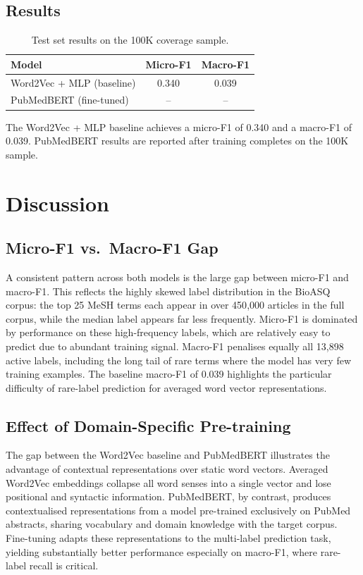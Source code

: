 \documentclass[sigconf]{acmart}
\begin{document}
\subsection{Results}

\begin{table}[h]
\caption{Test set results on the 100K coverage sample.}
\label{tab:results}
\begin{tabular}{lcc}
\toprule
\textbf{Model} & \textbf{Micro-F1} & \textbf{Macro-F1} \\
\midrule
Word2Vec + MLP (baseline) & 0.340 & 0.039 \\
PubMedBERT (fine-tuned)   & --    & --    \\
\bottomrule
\end{tabular}
\end{table}

The Word2Vec + MLP baseline achieves a micro-F1 of 0.340 and a macro-F1 of 0.039.
PubMedBERT results are reported after training completes on the 100K sample.

\section{Discussion}
\label{sec:discussion}

\subsection{Micro-F1 vs.\ Macro-F1 Gap}

A consistent pattern across both models is the large gap between micro-F1 and macro-F1.
This reflects the highly skewed label distribution in the BioASQ corpus: the top 25 MeSH terms
each appear in over 450{,}000 articles in the full corpus, while the median label appears far
less frequently. Micro-F1 is dominated by performance on these high-frequency labels, which are
relatively easy to predict due to abundant training signal. Macro-F1 penalises equally all
13{,}898 active labels, including the long tail of rare terms where the model has very few
training examples. The baseline macro-F1 of 0.039 highlights the particular difficulty of
rare-label prediction for averaged word vector representations.

\subsection{Effect of Domain-Specific Pre-training}

The gap between the Word2Vec baseline and PubMedBERT illustrates the advantage of contextual
representations over static word vectors. Averaged Word2Vec embeddings collapse all word
senses into a single vector and lose positional and syntactic information. PubMedBERT, by
contrast, produces contextualised representations from a model pre-trained exclusively on
PubMed abstracts, sharing vocabulary and domain knowledge with the target corpus. Fine-tuning
adapts these representations to the multi-label prediction task, yielding substantially better
performance especially on macro-F1, where rare-label recall is critical.
\end{document}
